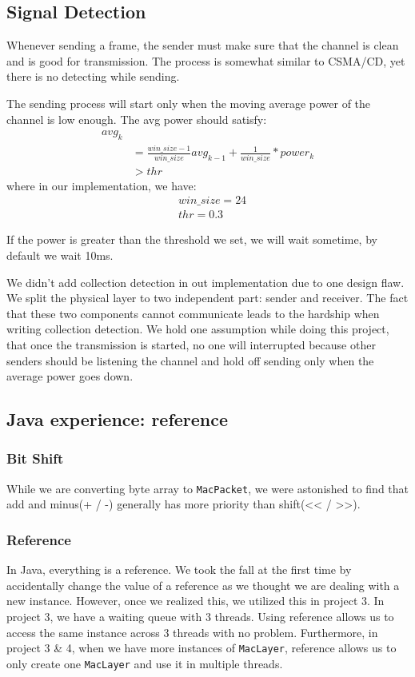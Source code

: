 \documentclass[conference,compsoc]{IEEEtran}
\begin{document}
	\subsection{Signal Detection}
		Whenever sending a frame, the sender must make sure that the channel is clean and is good for transmission.
		The process is somewhat similar to CSMA/CD, yet there is no detecting while sending.
		\par
		The sending process will start only when the moving average power of the channel is low enough. The avg power should satisfy:
		\begin{equation}\begin{aligned}
		avg_k \\
		& = 
			\frac{win\_size-1}{win\_size}avg_{k-1} + 
			\frac{1}{win\_size} * power_k \\
		& > thr
		\end{aligned}\end{equation}
		where in our implementation, we have:
		\begin{equation*}\begin{aligned} 
			& win\_size = 24 \\
			& thr = 0.3 
		\end{aligned}\end{equation*}
		\par
		If the power is	greater than the threshold we set, we will wait sometime, by default we wait 10ms.
		\par 
		We didn't add collection detection in out implementation due to one design flaw. 
		We split the physical layer to two independent part: sender and receiver. 
		The fact that these two components cannot communicate leads to the hardship when writing collection detection. 
		We hold one assumption while doing this project, that once the transmission is started, no one will interrupted because other senders should be listening the channel and hold off sending only when the average power goes down.
	\subsection{Java experience: reference}
		\subsubsection{Bit Shift} 
			While we are converting byte array to \lstinline{MacPacket}, we were astonished to find that add and minus(+ / -) generally has more priority than shift(<< / >>).
		\subsubsection{Reference} 
			In Java, everything is a reference. 
			We took the fall at the first time by accidentally change the value of a reference as we thought we are dealing with a new instance. 
			However, once we realized this, we utilized this in project 3. 
			In project 3, we have a waiting queue with 3 threads.
			Using reference allows us to access the same instance across 3 threads with no problem.
			Furthermore, in project 3 \& 4, when we have more instances of \lstinline{MacLayer}, reference allows us to only create one \lstinline{MacLayer} and use it in multiple threads.
\end{document}
